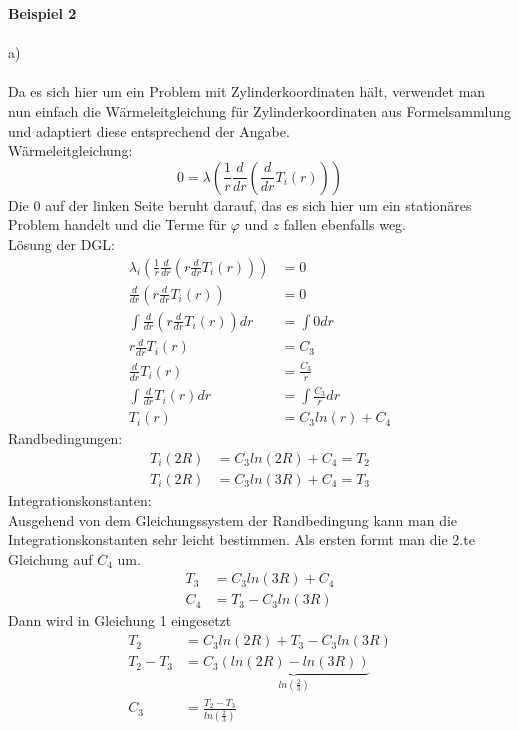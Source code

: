 \newpage
\noindent
\textbf{Beispiel 2} \\ \\
a) \\ \\
Da es sich hier um ein Problem mit Zylinderkoordinaten hält, verwendet man nun einfach die Wärmeleitgleichung für Zylinderkoordinaten aus Formelsammlung und adaptiert diese entsprechend der Angabe. \\
\newline
Wärmeleitgleichung:
\[
	0 = \lambda \left( \frac{1}{r} \frac{d}{dr}\left( \frac{d}{dr} T_i\left( r\right)\right)\right)
\]
Die 0 auf der linken Seite beruht darauf, das es sich hier um ein stationäres Problem handelt und die Terme für $\varphi$ und $z$ fallen ebenfalls weg. \\
\newline
Lösung der DGL:
\begin{align*}
	\lambda_i \left( \frac{1}{r} \frac{d}{dr}\left( r \frac{d}{dr} T_i\left( r\right)\right)\right) &= 0
	\\
	\frac{d}{dr}\left( r \frac{d}{dr} T_i\left( r\right)\right) &= 0
	\\
	\int \frac{d}{dr}\left( r \frac{d}{dr} T_i\left( r\right)\right) dr &= \int 0 dr
	\\
	r \frac{d}{dr} T_i\left( r\right) &= C_3
	\\
	\frac{d}{dr} T_i\left( r\right) &= \frac{C_3}{r}
	\\
	\int \frac{d}{dr} T_i\left( r\right) dr &= \int \frac{C_3}{r} dr
	\\
	T_i\left( r\right) &= C_3 ln\left(r \right) + C_4
\end{align*}
Randbedingungen:
\begin{align*}
	T_i\left(2R\right) &= C_3 ln\left( 2R\right) + C_4 = T_2 \\
	T_i\left(2R\right) &= C_3 ln\left( 3R\right) + C_4 = T_3
\end{align*}
Integrationskonstanten: \\
\newline
Ausgehend von dem Gleichungssystem der Randbedingung kann man die Integrationskonstanten sehr leicht bestimmen. Als ersten formt man die 2.te Gleichung auf $C_4$ um.
\begin{align*}
	T_3 &= C_3 ln\left( 3R\right) + C_4\\
	C_4 &= T_3 - C_3 ln\left( 3R\right)
\end{align*}
Dann wird in Gleichung 1 eingesetzt
\begin{align*}
	T_2 &= C_3 ln\left( 2R\right) + T_3 - C_3 ln\left( 3R\right) \\
	T_2 - T_3 &= C_3 \underbrace{\left( ln\left( 2R\right) - ln\left( 3R\right) \right)}_{ln\left( \frac{2}{3}\right)} \\
	C_3 &= \frac{T_2 - T_3}{ln\left( \frac{2}{3}\right)}
\end{align*}
